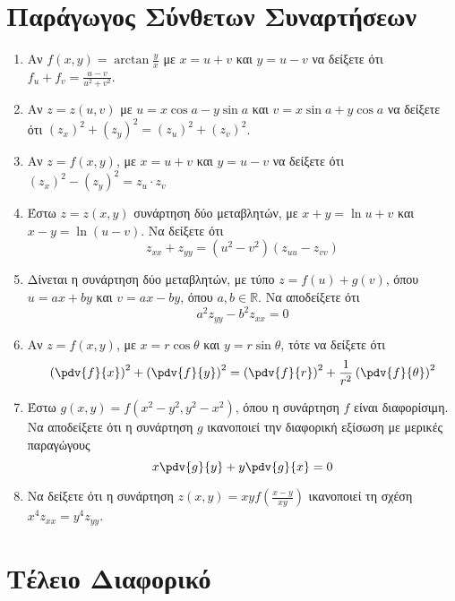 \section*{Παράγωγος Σύνθετων Συναρτήσεων} 

\begin{enumerate}
  \item Αν $ f(x,y) = \arctan{\frac{y}{x}} $ με $ x=u+v $ και $ y = u-v $ 
    να δείξετε ότι $ f_{u} + f_{v} = \frac{u-v}{u^{2}+v^{2}} $.

  \item  Αν $ z=z(u,v) $ με $ u=x \cos{a} - y \sin{a} $ και $ v= x \sin{a} + y \cos{a} $
    να δείξετε ότι $ (z_{x})^{2} + (z_{y})^{2} = (z_{u})^{2} + (z_{v})^{2} $.

  \item Αν $ z=f(x,y) $, με $ x=u+v $ και $ y = u-v $ να δείξετε ότι 
    $ (z_{x})^{2} - (z_{y})^{2} = z_{u}\cdot z_{v} $ 

  \item Έστω $ z=z(x,y) $ συνάρτηση δύο μεταβλητών, με $ x+y= \ln{u+v} $ και 
    $ x-y = \ln{(u-v)} $. Να δείξετε ότι 
    \[
      z_{xx}+z_{yy} = (u^{2}-v^{2})(z_{uu}-z_{vv}) 
    \]
  \item Δίνεται η συνάρτηση δύο μεταβλητών, με τύπο
    $ z = f(u) + g(v) $, όπου $ u = ax + by $ και $ v = ax - by $, όπου 
    $ a,b \in \mathbb{R} $. Να αποδείξετε ότι 
    \[
      a^{2} z_{yy} - b^{2}z_{xx} = 0 
    \] 
  \item Αν $ z = f(x,y) $, με $ x=r \cos{\theta} $ και $ y = r \sin{\theta} $, 
    τότε να δείξετε ότι
    \[
      \left(\pdv{f}{x}\right)^{2} + \left(\pdv{f}{y}\right)^{2} = 
      \left(\pdv{f}{r}\right)^{2} + \frac{1}{ r^{2}} 
      \left(\pdv{f}{\theta}\right)^{2} 
    \] 
  \item Έστω $ g(x,y) = f(x^{2} - y^{2}, y^{2} - x^{2}) $, όπου η συνάρτηση 
    $f$ είναι διαφορίσιμη. Να αποδείξετε ότι η συνάρτηση $g$ ικανοποιεί 
    την διαφορική εξίσωση με μερικές παραγώγους
    \[
      x\pdv{g}{y} + y\pdv{g}{x} = 0
    \] 
  \item Να δείξετε ότι η συνάρτηση $ z(x,y) = xyf\left(\frac{ x-y }{ xy }\right) $
    ικανοποιεί τη σχέση $ x^{4} z_{xx} = y^{4} z_{yy} $.
\end{enumerate}



\section*{Τέλειο Διαφορικό}

